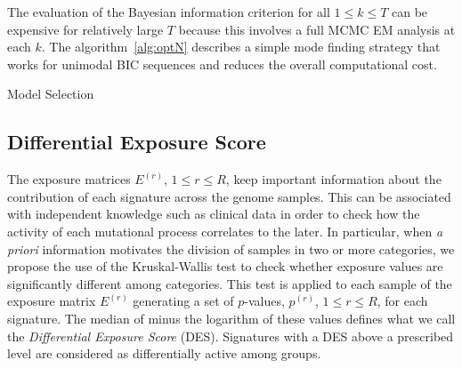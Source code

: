 \documentclass{bioinfo}
\makeatletter
\def\BState{\State\hskip-\ALG@thistlm}
\makeatother
\begin{document}
The evaluation of the Bayesian information criterion for all
$1\leq k \leq T$ can be expensive for relatively large $T$
because this involves a full MCMC EM analysis at each $k$. The
algorithm~\ref{alg:optN} describes a simple mode finding strategy that 
works for unimodal BIC sequences and reduces the overall computational
cost.  

\begin{algorithm}
\caption{Model Selection}\label{alg:optN}
\end{algorithm}

\subsection{Differential Exposure Score}\label{sec:DES}
The exposure matrices $E^{(r)}$, $1 \leq r \leq R$, keep important
information about the contribution of each signature across the genome
samples. This can be associated with independent knowledge such as
clinical data in order to check how the activity of each mutational
process correlates to the later. In particular, when \emph{a priori}
information motivates the division of samples in two or more
categories, we propose the use of the Kruskal-Wallis test to check
whether exposure values are significantly different among
categories. This test is applied to each sample of the exposure matrix
$E^{(r)}$ generating a set of $p$-values, $p^{(r)}$, $1 \leq r \leq
R$, for each signature. The median of minus the logarithm of these
values defines what we call the \emph{Differential Exposure Score}
(DES). Signatures with a DES above a prescribed level are considered
as differentially active among groups.
\end{document}
